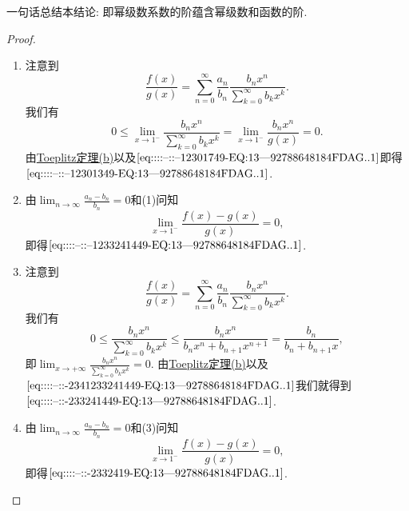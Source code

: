 \documentclass[../../main.tex]{subfiles}%
\begin{document}
\begin{remark}
一句话总结本结论: 即幂级数系数的阶蕴含幂级数和函数的阶.
\end{remark}
\begin{proof}
\begin{enumerate}[(1)]
\item 注意到
\[
\frac{f(x)}{g(x)} = \sum_{n=0}^{\infty} \frac{a_n}{b_n} \frac{b_n x^n}{\sum\limits_{k=0}^{\infty} b_k x^k}.
\]
我们有
\[
0 \leqslant \lim_{x \to 1^-} \frac{b_n x^n}{\sum\limits_{k=0}^{\infty} b_k x^k} = \lim_{x \to 1^-} \frac{b_n x^n}{g(x)} = 0.
\]
由\hyperref[theorem:Toeplitz定理]{Toeplitz定理(b)}以及\(\eqref{eq::::--::--12301749-EQ:13---92788648184FDAG..1}\)即得\(\eqref{eq::::--::--12301349-EQ:13---92788648184FDAG..1}\).

\item 由\(\lim_{n \to \infty} \frac{a_n - b_n}{b_n} = 0\)和(1)问知
\[
\lim_{x \to 1^-} \frac{f(x) - g(x)}{g(x)} = 0,
\]
即得\(\eqref{eq::::--::--1233241449-EQ:13---92788648184FDAG..1}\).

\item 注意到
\[
\frac{f(x)}{g(x)} = \sum_{n=0}^{\infty} \frac{a_n}{b_n} \frac{b_n x^n}{\sum\limits_{k=0}^{\infty} b_k x^k}.
\]
我们有
\[
0 \leqslant \frac{b_n x^n}{\sum\limits_{k=0}^{\infty} b_k x^k} \leqslant \frac{b_n x^n}{b_n x^n + b_{n+1} x^{n+1}} = \frac{b_n}{b_n + b_{n+1} x},
\]
即\(\lim_{x \to +\infty} \frac{b_n x^n}{\sum\limits_{k=0}^{\infty} b_k x^k} = 0\). 由\hyperref[theorem:Toeplitz定理]{Toeplitz定理(b)}以及\(\eqref{eq::::--::-2341233241449-EQ:13---92788648184FDAG..1}\)我们就得到\(\eqref{eq::::--::-233241449-EQ:13---92788648184FDAG..1}\).

\item 由\(\lim_{n \to \infty} \frac{a_n - b_n}{b_n} = 0\)和(3)问知
\[
\lim_{x \to 1^-} \frac{f(x) - g(x)}{g(x)} = 0,
\]
即得\(\eqref{eq::::--::-2332419-EQ:13---92788648184FDAG..1}\).
\end{enumerate}

\end{proof}
\end{document}
